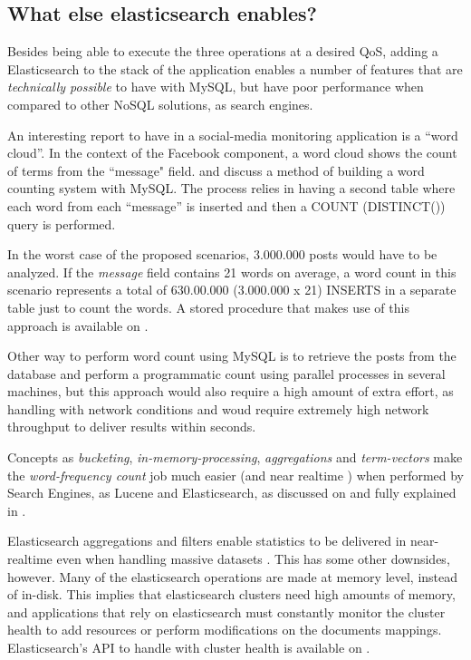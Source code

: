 \subsection{What else elasticsearch enables?}

Besides being able to execute the three operations at a desired QoS, adding a Elasticsearch to the stack of the application enables a number of features that are \textit{technically possible} to have with MySQL, but have poor performance when compared to other NoSQL solutions, as search engines.

An interesting report to have in a social-media monitoring application is a ``word cloud''. In the context of the Facebook component, a word cloud shows the count of terms from the ``message" field. \cite{mysqlstringsplitter} and \cite{mysqlSplitterStoredProcedure} discuss a method of building a word counting system with MySQL. The process relies in having a second table where each word from each ``message'' is inserted and then a COUNT (DISTINCT()) query is performed. 

In the worst case of the proposed scenarios, 3.000.000 posts would have to be analyzed. If the \textit{message} field contains 21 words on average, a word count in this scenario represents a total of 630.00.000 (3.000.000 x 21) INSERTS in a separate table just to count the words. A stored procedure that makes use of this approach is available on \cite{mysqlSplitterStoredProcedure}.

Other way to perform word count using MySQL is to retrieve the posts from the database and perform a programmatic count using parallel processes in several machines, but this approach would also require a high amount of extra effort, as handling with network conditions and woud require extremely high network throughput to deliver results within seconds. 

Concepts as \textit{bucketing}, \textit{in-memory-processing}, \textit{aggregations} and \textit{term-vectors} make the \textit{word-frequency count} job much easier (and near realtime \cite{termVectorsES}) when performed by Search Engines, as Lucene and Elasticsearch, as discussed on \cite{mysqlSplitterStoredProcedure} and fully explained in \cite{termVectorsES}.

Elasticsearch aggregations and filters enable statistics to be delivered in near-realtime even when handling massive datasets \cite{termVectorsES}. This has some other downsides, however. Many of the elasticsearch operations are made at memory level, instead of in-disk. This implies that elasticsearch clusters need high amounts of memory, and applications that rely on elasticsearch must constantly monitor the cluster health to add resources or perform modifications on the documents mappings. Elasticsearch's API to handle with cluster health is available on \cite{clusterHealthES}. 

